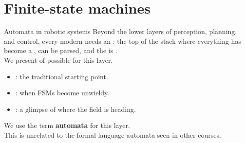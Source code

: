 
\section{Finite-state machines}
\graphicspath{{figs/section1/}}

\begin{frame}{Automata in robotic systems}
  \justifying
  Beyond the lower layers of perception, planning, and control, every modern  needs an : the top of the stack where everything has become a ,  can be parsed, and the  is .\\
  \bigskip
  We present  of possible  for this layer.
  \begin{itemize}
    \item {}: the traditional starting point.
    \item {}: when FSMs become unwieldy.
    \item {}: a glimpse of where the field is heading.
  \end{itemize}
  \bigskip
  \begin{block}{}
    \centering
    We use the term \textbf{automata} for this layer.\\
    This is unrelated to the formal-language automata seen in other courses.
  \end{block}
\end{frame}

